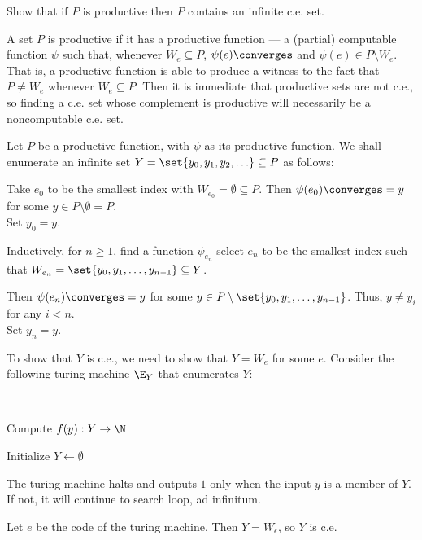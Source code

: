 \begin{problem}
  Show that if $P$ is productive then $P$ contains an infinite c.e. set.

  \begin{definition}
    A set $P$ is productive if it has a productive function ---
    a (partial) computable function $\psi$ such that, whenever
    $W_e \subseteq P$, $\psi(e) \converges$ and $\psi(e) \in P \setminus W_e$.
    That is, a productive function is able to
    produce a witness to the fact that $P \neq W_e$ whenever $W_e \subseteq P$.
    Then it is immediate that productive sets are not c.e., so finding a c.e. set whose complement
    is productive will necessarily be a noncomputable c.e. set.
  \end{definition}

  \begin{answer}
    Let $P$ be a productive function, with $\psi$ as its productive function.
    We shall enumerate an infinite set
    $Y = \set{y_0, y_1, y_2, \ldots } \subseteq P$ as follows:

    \begin{enumarabic}
      \item Take $e_0$ to be the smallest index with $W_{e_0} = \emptyset \subseteq P$.
        Then $\psi(e_0) \converges = y$ for some $y \in P \setminus \emptyset = P$. \\
        Set $y_0 = y$.

      \item Inductively, for $n \geq 1$, find a function $\psi_{e_n}$
        select $e_n$ to be the smallest index
        such that $W_{e_n} = \set{y_0, y_1, \ldots, y_{n-1}} \subseteq Y$.
        
        Then $\psi(e_n) \converges = y$ for some $y \in P \setminus \set{y_0, y_1, \ldots, y_{n-1}}$.
        Thus, $y \neq y_i$ for any $i < n$.\\
        Set $y_n = y$.
    \end{enumarabic}

    To show that $Y$ is c.e., we need to show that $Y = W_e$ for some $e$.
    Consider the following turing machine $\E_Y$ that enumerates $Y$:

    \step
    \begin{algorithm}[H]~\label{tm:5.1}
      \caption{Compute $f(y) : Y \to \N$}
      Initialize $Y \gets \emptyset$ \\
    \end{algorithm}

    The turing machine halts and outputs $1$ only when the input $y$ is a member of $Y$.
    If not, it will continue to search loop, ad infinitum.

    Let $e$ be the code of the turing machine.
    Then $Y = W_{\epsilon}$, so $Y$ is c.e.
  \end{answer}
\end{problem}
